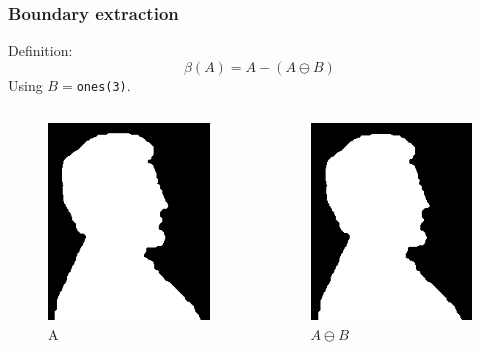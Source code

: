\begin{frame}
\frametitle{Boundary extraction}
Definition:
\[
\beta (A) = A - \left  ( A \ominus B \right  )
\]
Using $B = $\texttt{ones(3)}.
\begin{columns}
\begin{column}{.33\textwidth}
\begin{figure}
\centering
\includegraphics[width=.6\textwidth]{A.png}
\caption{A}
\end{figure}
\end{column}
\begin{column}{.33\textwidth}
\begin{figure}
\centering
\includegraphics[width=.6\textwidth]{B.png}
\caption{$A\ominus B$}
\end{figure}

\end{column}
\end{columns}
\end{frame}
